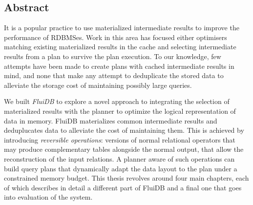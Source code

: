 \setcounter{page}{1}%

\maketitle%

\begin{precontent}
%

\chapter{Abstract}%

It is a popular practice to use materialized intermediate results to improve the performance of RDBMSes. Work in this area has focused either optimisers matching existing materialized results in the cache and selecting intermediate results from a plan to survive the plan execution. To our knowledge, few attempts have been made to create plans with cached intermediate results in mind, and none that make any attempt to deduplicate the stored data to alleviate the storage cost of maintaining possibly large queries.

We built \emph{FluiDB} to explore a novel approach to integrating the selection of materialized results with the planner to optimize the logical representation of data in memory. FluiDB materializes common intermediate results and deduplucates data to alleviate the cost of maintaining them. This is achieved by introducing \emph{reversible operations}: versions of normal relational operators that may produce complementary tables alongside the normal output, that allow the reconstruction of the input relations. A planner aware of such operations can build query plans that dynamically adapt the data layout to the plan under a constrained memory budget. This thesis revolves around four main chapters, each of which describes in detail a different part of FluiDB and a final one that goes into evaluation of the system.


\end{precontent}

